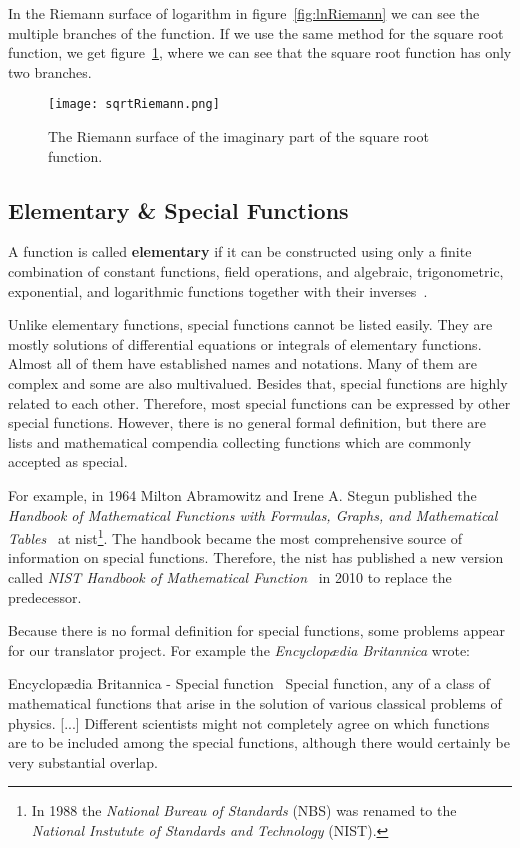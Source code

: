 In the Riemann surface of logarithm in figure~\ref{fig:lnRiemann} we can see the multiple branches of the function. If we use the same method for the square root function, we get figure~\ref{fig:sqrtRiemann}, where we can see that the square root function has only two branches.

\begin{figure}[!ht]
	\centering
	\texttt{[image: sqrtRiemann.png]}
	\caption{The Riemann surface of the imaginary part of the square root function.}
	\label{fig:sqrtRiemann}
\end{figure}

\subsection{Elementary \& Special Functions}\label{subsec:special-functions}
A function is called \textbf{elementary} if it can be constructed using only a finite combination of constant functions, field operations, and algebraic, trigonometric, exponential, and logarithmic functions together with their inverses~\cites{Elementary:1}[145]{Elementary:2}.

Unlike elementary functions, special functions cannot be listed easily. They are mostly solutions of differential equations or integrals of elementary functions. Almost all of them have established names and notations. Many of them are complex and some are also multivalued. Besides that, special functions are highly related to each other. Therefore, most special functions can be expressed by other special functions. However, there is no general formal definition, but there are lists and mathematical compendia collecting functions which are commonly accepted as special. 

For example, in 1964 Milton Abramowitz and Irene A. Stegun published the \textit{Handbook of Mathematical Functions with Formulas, Graphs, and Mathematical Tables}~\cite{AbramowitzStegun} at \gls{nist}\footnote{In 1988 the \textit{National Bureau of Standards} (NBS) was renamed to the \textit{National Instutute of Standards and Technology} (NIST).}. The handbook became the most comprehensive source of information on special functions. Therefore, the \gls{nist} has published a new version called \textit{NIST Handbook of Mathematical Function}~\cite{NIST:Handbook} in 2010 to replace the predecessor.

Because there is no formal definition for special functions, some problems appear for our translator project. For example the \textit{Encyclop\ae{dia} Britannica} wrote:
\begin{myQuote}{Encyclop\ae{dia} Britannica - Special function~\cite{SpecialFunctions:britannica}}
	Special function, any of a class of mathematical functions that arise in the solution of various classical problems of physics. [...] Different scientists might not completely agree on which functions are to be included among the special functions, although there would certainly be very substantial overlap.
\end{myQuote}

